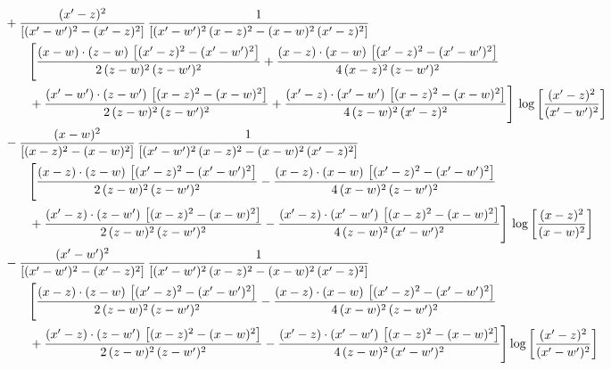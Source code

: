 \documentclass[10pt]{article}
\numberwithin{equation}{section}
\begin{document}
\begin{align}
&\qquad+\frac{(x^{\prime}-z)^{2}}{\left[(x^{\prime}-w^{\prime})^{2}-(x^{\prime}-z)^{2}\right]}\,\frac{1}{\left[(x^{\prime}-w^{\prime})^{2}\,(x-z)^{2} - (x-w)^{2}\,(x^{\prime}-z)^{2}\right]}\notag\\&\qquad\qquad  \Bigg[\frac{(x-w)\cdot (z-w)\, \left[(x^{\prime}-z)^{2}-(x^{\prime}-w^{\prime})^{2}\right]}{2\, (z-w)^{2}\, (z-w^{\prime})^{2}}  + \frac{(x-z)\cdot (x-w)\,\left[(x^{\prime}-z)^{2}-(x^{\prime}-w^{\prime})^{2}\right] }{4\,(x-z)^{2}\,(z-w^{\prime})^{2}}\notag\\&\qquad\qquad  +\frac{(x^{\prime}-w^{\prime})\cdot (z-w^{\prime})\, \left[(x-z)^{2}-(x-w)^{2}\right]}{2\, (z-w)^{2}\, (z-w^{\prime})^{2}}+ \frac{(x^{\prime}-z)\cdot (x^{\prime}-w^{\prime})\, \left[(x-z)^{2}-(x-w)^{2}\right]}{4\, (z-w)^{2}\,(x^{\prime}-z)^{2}}\Bigg]\, \log{\left[\frac{(x^{\prime}-z)^{2}}{(x^{\prime}-w^{\prime})^{2}}\right]}\notag\\
&\qquad-\frac{(x-w)^{2}}{\left[(x-z)^{2}-(x-w)^{2}\right]}\, \frac{1}{\left[(x^{\prime}-w^{\prime})^{2}\, (x-z)^{2} - (x-w)^{2}\, (x^{\prime}-z)^{2}\right]} \notag\\&\qquad\qquad  \Bigg[\frac{(x-z)\cdot (z-w)\, \left[(x^{\prime}-z)^{2}-(x^{\prime}-w^{\prime})^{2}\right]}{2\, (z-w)^{2}\, (z-w^{\prime})^{2}}  - \frac{(x-z)\cdot (x-w)\,\left[(x^{\prime}-z)^{2}-(x^{\prime}-w^{\prime})^{2}\right] }{4\,(x-w)^{2}\,(z-w^{\prime})^{2}}\notag\\&\qquad\qquad  +\frac{(x^{\prime}-z)\cdot (z-w^{\prime})\, \left[(x-z)^{2}-(x-w)^{2}\right]}{2\, (z-w)^{2}\, (z-w^{\prime})^{2}}-\frac{(x^{\prime}-z)\cdot (x^{\prime}-w^{\prime})\, \left[(x-z)^{2}-(x-w)^{2}\right]}{4\, (z-w)^{2}\,(x^{\prime}-w^{\prime})^{2}}\Bigg]\, \log{\left[\frac{(x-z)^{2}}{(x-w)^{2}}\right]}\notag\\
&\qquad-\frac{(x^{\prime}-w^{\prime})^{2}}{\left[(x^{\prime}-w^{\prime})^{2}-(x^{\prime}-z)^{2}\right]}\, \frac{1}{\left[(x^{\prime}-w^{\prime})^{2}\, (x-z)^{2} - (x-w)^{2}\, (x^{\prime}-z)^{2}\right]}  \notag\\&\qquad\qquad  \Bigg[\frac{(x-z)\cdot (z-w)\, \left[(x^{\prime}-z)^{2}-(x^{\prime}-w^{\prime})^{2}\right]}{2\, (z-w)^{2}\, (z-w^{\prime})^{2}}  - \frac{(x-z)\cdot (x-w)\,\left[(x^{\prime}-z)^{2}-(x^{\prime}-w^{\prime})^{2}\right] }{4\,(x-w)^{2}\,(z-w^{\prime})^{2}}\notag\\&\qquad\qquad  +\frac{(x^{\prime}-z)\cdot (z-w^{\prime})\, \left[(x-z)^{2}-(x-w)^{2}\right]}{2\, (z-w)^{2}\, (z-w^{\prime})^{2}}-\frac{(x^{\prime}-z)\cdot (x^{\prime}-w^{\prime})\, \left[(x-z)^{2}-(x-w)^{2}\right]}{4\, (z-w)^{2}\,(x^{\prime}-w^{\prime})^{2}}\Bigg] \log{\left[\frac{(x^{\prime}-z)^{2}}{(x^{\prime}-w^{\prime})^{2}}\right]}\notag\\

\end{align}
\end{document}
